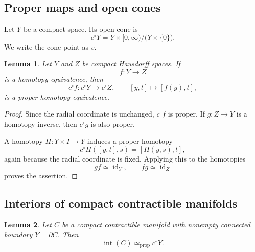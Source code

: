 \documentclass[10pt,reqno]{amsart}
\numberwithin{equation}{section}
\newtheorem{lemma}{Lemma}
\theoremstyle{definition}
\theoremstyle{remark}
\newcommand{\Int}{\operatorname{int}}
\newcommand{\id}{\operatorname{id}}
\newcommand{\simeqp}{\simeq_{\mathrm{prop}}}
\begin{document}
\subsection{Proper maps and open cones}

Let \(Y\) be a compact space.  Its open cone is
\[
c^\circ Y
=
Y\times[0,\infty)\big/
\bigl(Y\times\{0\}\bigr).
\]
We write the cone point as \(v\).

\begin{lemma}\label{lem:cone-map}
Let \(Y\) and \(Z\) be compact Hausdorff spaces.  If
\[
f\colon Y\longrightarrow Z
\]
is a homotopy equivalence, then
\[
c^\circ f\colon c^\circ Y\longrightarrow c^\circ Z,
\qquad
[y,t]\longmapsto[f(y),t],
\]
is a proper homotopy equivalence.
\end{lemma}

\begin{proof}
Since the radial coordinate is unchanged, \(c^\circ f\) is proper.
If \(g\colon Z\to Y\) is a homotopy inverse, then \(c^\circ g\) is
also proper.

A homotopy \(H\colon Y\times I\to Y\) induces a proper homotopy
\[
c^\circ H([y,t],s)=[H(y,s),t],
\]
again because the radial coordinate is fixed.  Applying this to the
homotopies
\[
gf\simeq\id_Y,
\qquad
fg\simeq\id_Z
\]
proves the assertion.
\end{proof}

\subsection{Interiors of compact contractible manifolds}

\begin{lemma}\label{lem:interior-cone}
Let \(C\) be a compact contractible manifold with nonempty connected
boundary \(Y=\partial C\).  Then
\[
\Int(C)\simeqp c^\circ Y.
\]
\end{lemma}
\end{document}
